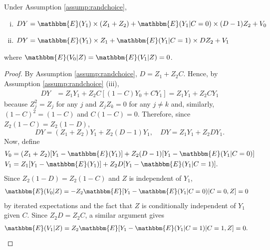 \begin{appendix}
\begin{prop}
\label{prop:ASLreg}
Under Assumption \ref{assump:randchoice},
\begin{enumerate}[(i)]
\item $D Y = \mathbbm{E}(Y_{1}) \times(Z_1 + Z_2) + \mathbbm{E}(Y_{1}|C=0)\times (D - 1)Z_2 + V_{0}$
\item  $D Y = \mathbbm{E}(Y_{1}) \times Z_1 + \mathbbm{E}(Y_{1}|C=1)\times D Z_2+ V_{1}$
\end{enumerate}
where $\mathbbm{E}(V_0|Z) = \mathbbm{E}(V_1|Z) = 0$.
\end{prop}


\begin{proof}
By Assumption \ref{assump:randchoice}, $D = Z_1 + Z_2 C$. Hence, by Assumption \ref{assump:randchoice} (iii),
\begin{align*}
DY 
&= Z_1 Y_1 + Z_2 C[(1 -C) Y_0 + C Y_1] = Z_1 Y_1 + Z_2 C Y_1
\end{align*}
because $Z_j^2 = Z_j$ for any $j$ and $Z_j Z_k = 0$ for any $j \neq k$ and, similarly, $(1 - C)^2 = (1 - C)$ and $C (1 - C) = 0$. Therefore, since $Z_2 (1 - C) = Z_2 (1 - D)$,
\[
 DY = (Z_1 + Z_2)Y_1 + Z_2 (D - 1) Y_1, \quad
 DY = Z_1 Y_1 + Z_2 D Y_1.
\]
Now, define
\begin{align*}
V_0 &= (Z_1 + Z_2)[Y_1 - \mathbbm{E}(Y_1)] + Z_2(D - 1)[Y_1 - \mathbbm{E}(Y_1|C=0)]\\
V_1 &= Z_1[Y_1 - \mathbbm{E}(Y_1)] + Z_2D[Y_1 - \mathbbm{E}(Y_1|C=1)].
\end{align*}
Since $Z_2(1 - D) = Z_2(1 - C)$ and $Z$ is independent of $Y_1$,
\begin{align*}
\mathbbm{E}(V_0|Z) 
&= -Z_2 \mathbbm{E}[Y_1 - \mathbbm{E}(Y_1 | C=0)|C=0, Z] = 0
\end{align*}
by iterated expectations and the fact that  $Z$ is conditionally independent of $Y_1$ given $C$. 
Since $Z_2 D = Z_2 C$, a similar argument gives
\begin{align*}
\mathbbm{E}(V_1|Z) 
&= Z_2 \mathbbm{E}[Y_1 - \mathbbm{E}(Y_1 | C=1)|C=1, Z] = 0. \qedhere
\end{align*}
\end{proof}



\end{appendix}
